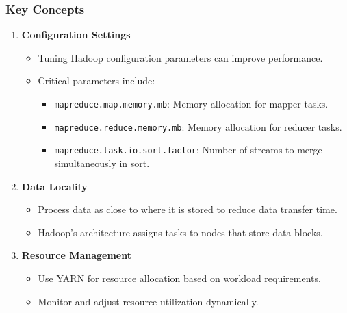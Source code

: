 \documentclass[aspectratio=169]{beamer}
\begin{document}
\begin{frame}[fragile]
    \frametitle{Key Concepts}
    \begin{enumerate}
        \item \textbf{Configuration Settings}
        \begin{itemize}
            \item Tuning Hadoop configuration parameters can improve performance.
            \item Critical parameters include:
            \begin{itemize}
                \item \texttt{mapreduce.map.memory.mb}: Memory allocation for mapper tasks.
                \item \texttt{mapreduce.reduce.memory.mb}: Memory allocation for reducer tasks.
                \item \texttt{mapreduce.task.io.sort.factor}: Number of streams to merge simultaneously in sort.
            \end{itemize}
        \end{itemize}
        \item \textbf{Data Locality}
        \begin{itemize}
            \item Process data as close to where it is stored to reduce data transfer time.
            \item Hadoop's architecture assigns tasks to nodes that store data blocks.
        \end{itemize}
        \item \textbf{Resource Management}
        \begin{itemize}
            \item Use YARN for resource allocation based on workload requirements.
            \item Monitor and adjust resource utilization dynamically.
        \end{itemize}
    \end{enumerate}
\end{frame}
\end{document}
